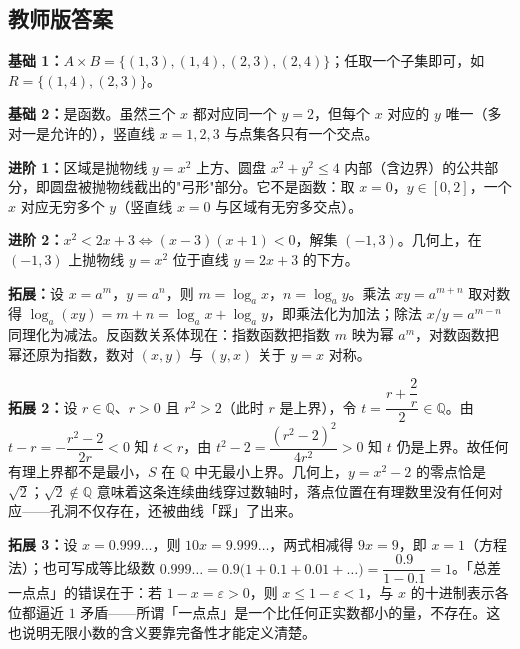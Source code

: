 \begin{afterclass}
\subsection*{教师版答案}
\begin{solution}
\textbf{基础 1：}$A\times B=\{(1,3),(1,4),(2,3),(2,4)\}$；任取一个子集即可，如 $R=\{(1,4),(2,3)\}$。
\end{solution}
\begin{solution}
\textbf{基础 2：}是函数。虽然三个 $x$ 都对应同一个 $y=2$，但每个 $x$ 对应的 $y$ 唯一（多对一是允许的），竖直线 $x=1,2,3$ 与点集各只有一个交点。
\end{solution}
\begin{solution}
\textbf{进阶 1：}区域是抛物线 $y=x^2$ 上方、圆盘 $x^2+y^2\leq4$ 内部（含边界）的公共部分，即圆盘被抛物线截出的"弓形"部分。它不是函数：取 $x=0$，$y\in[0,2]$，一个 $x$ 对应无穷多个 $y$（竖直线 $x=0$ 与区域有无穷多交点）。
\end{solution}
\begin{solution}
\textbf{进阶 2：}$x^2<2x+3\iff(x-3)(x+1)<0$，解集 $(-1,3)$。几何上，在 $(-1,3)$ 上抛物线 $y=x^2$ 位于直线 $y=2x+3$ 的下方。
\end{solution}
\begin{solution}
\textbf{拓展：}设 $x=a^{m}$，$y=a^{n}$，则 $m=\log_a x$，$n=\log_a y$。乘法 $xy=a^{m+n}$ 取对数得 $\log_a(xy)=m+n=\log_a x+\log_a y$，即乘法化为加法；除法 $x/y=a^{m-n}$ 同理化为减法。反函数关系体现在：指数函数把指数 $m$ 映为幂 $a^m$，对数函数把幂还原为指数，数对 $(x,y)$ 与 $(y,x)$ 关于 $y=x$ 对称。
\end{solution}
\begin{solution}
\textbf{拓展 2：}设 $r\in\mathbb{Q}$、$r>0$ 且 $r^2>2$（此时 $r$ 是上界），令 $t=\dfrac{r+\dfrac{2}{r}}{2}\in\mathbb{Q}$。由 $t-r=-\dfrac{r^2-2}{2r}<0$ 知 $t<r$，由 $t^2-2=\dfrac{(r^2-2)^2}{4r^2}>0$ 知 $t$ 仍是上界。故任何有理上界都不是最小，$S$ 在 $\mathbb{Q}$ 中无最小上界。几何上，$y=x^2-2$ 的零点恰是 $\sqrt2$；$\sqrt2\notin\mathbb{Q}$ 意味着这条连续曲线穿过数轴时，落点位置在有理数里没有任何对应——孔洞不仅存在，还被曲线「踩」了出来。
\end{solution}
\begin{solution}
\textbf{拓展 3：}设 $x=0.999\dots$，则 $10x=9.999\dots$，两式相减得 $9x=9$，即 $x=1$（方程法）；也可写成等比级数 $0.999\dots=0.9\bigl(1+0.1+0.01+\dots\bigr)=\dfrac{0.9}{1-0.1}=1$。「总差一点点」的错误在于：若 $1-x=\varepsilon>0$，则 $x\leq1-\varepsilon<1$，与 $x$ 的十进制表示各位都逼近 $1$ 矛盾——所谓「一点点」是一个比任何正实数都小的量，不存在。这也说明无限小数的含义要靠完备性才能定义清楚。
\end{solution}
\end{afterclass}
